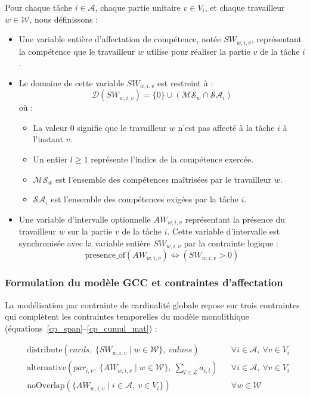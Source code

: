 Pour chaque tâche $i \in \mathcal{A}$, chaque partie unitaire $v \in V_i$, et chaque travailleur $w \in \mathcal{W}$, nous définissons :
\begin{itemize}
    \item Une variable entière d'affectation de compétence, notée $SW_{w,i,v}$, représentant la compétence que le travailleur $w$ utilise pour réaliser la partie $v$ de la tâche $i$.
    \item Le domaine de cette variable $SW_{w,i,v}$ est restreint à :
    \begin{equation}
        \mathcal{D}(SW_{w,i,v}) = \{0\} \cup \left( \mathcal{MS}_w \cap \mathcal{SA}_i \right)
    \end{equation}
    où :
    \begin{itemize}
        \item La valeur $0$ signifie que le travailleur $w$ n'est pas affecté à la tâche $i$ à l'instant $v$.
        \item Un entier $l \ge 1$ représente l'indice de la compétence exercée.
        \item $\mathcal{MS}_w$ est l'ensemble des compétences maîtrisées par le travailleur $w$.
        \item $\mathcal{SA}_i$ est l'ensemble des compétences exigées par la tâche $i$.
    \end{itemize}
    \item Une variable d'intervalle optionnelle $AW_{w,i,v}$ représentant la présence du travailleur $w$ sur la partie $v$ de la tâche $i$. Cette variable d'intervalle est synchronisée avec la variable entière $SW_{w,i,v}$ par la contrainte logique :
    \begin{equation}
        \text{presence\_of}(AW_{w,i,v}) \iff \left( SW_{w,i,v} > 0 \right)
    \end{equation}
\end{itemize}

\subsubsection{Formulation du modèle GCC et contraintes d'affectation}

La modélisation par contrainte de cardinalité globale repose sur trois contraintes qui complètent les contraintes temporelles du modèle monolithique (équations~\ref{cp_span}--\ref{cp_cumul_mat}) :

\begin{align}
    & \text{distribute}\left( cards,\ \{SW_{w,i,v} \mid w \in \mathcal{W}\},\ values \right) && \forall i \in \mathcal{A},\ \forall v \in V_i \label{gcc_dist} \\
    & \text{alternative}\left( par_{i,v},\ \{AW_{w,i,v} \mid w \in \mathcal{W}\},\ \sum_{l \in \mathcal{L}} a_{i,l} \right) && \forall i \in \mathcal{A},\ \forall v \in V_i \label{gcc_alt} \\
    & \text{noOverlap}\left( \{AW_{w,i,v} \mid i \in \mathcal{A},\ v \in V_i\} \right) && \forall w \in \mathcal{W} \label{gcc_disj}
\end{align}


